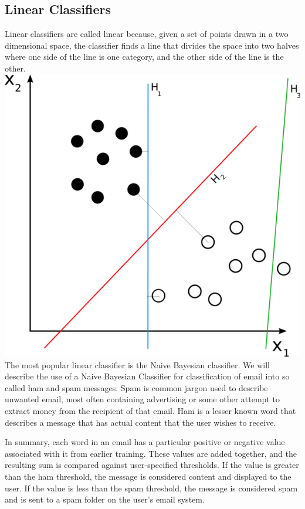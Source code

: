 \documentclass[12pt]{article}
\begin{document}
\subsection{Linear Classifiers}
Linear classifiers are called linear because, given a set of points drawn in a two dimensional space, the
classifier finds a line that divides the space into two halves where one side of the line is one category, and
the other side of the line is the other.\\
\includegraphics[scale=.4,natwidth=628,natheight=600]{svm_separating_hyperplanes.png}\\

The most popular linear classifier is the Naive Bayesian classifier. \cite{kononenko1991semi}
We will describe the use of a Naive Bayesian Classifier for classification of email into so called ham and
spam messages. Spam is common jargon used to describe unwanted email, most often containing advertising or
some other attempt to extract money from the recipient of that email. Ham is a lesser known word that
describes a message that has actual content that the user wishes to receive.

In summary, each word in an email has a particular positive or negative value associated with it from earlier
training. These values are added together, and the resulting sum is compared against user-specified
thresholds. If the value is greater than the ham threshold, the message is considered content and displayed to
the user. If the value is less than the spam threshold, the message is considered spam and is sent to a spam
folder on the user's email system.
\end{document}
